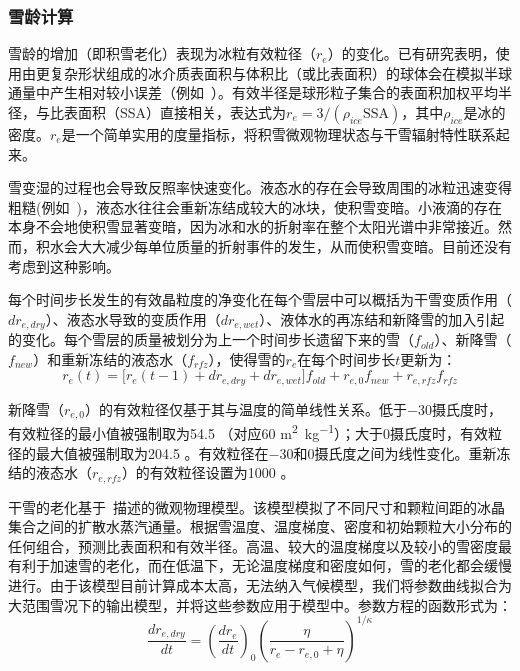 \subsubsection{雪龄计算}\label{雪龄计算}

雪龄的增加（即积雪老化）表现为冰粒有效粒径（$r_e$）的变化。已有研究表明，使用由更复杂形状组成的冰介质表面积与体积比（或比表面积）的球体会在模拟半球通量中产生相对较小误差（例如~\citet{grenfell1999RepresentationNonsphericalIce}）。有效半径是球形粒子集合的表面积加权平均半径，与比表面积（SSA）直接相关，表达式为$r_e=3/(\rho_{ice}\text{SSA})$，其中$\rho_{ice}$是冰的密度。$r_e$是一个简单实用的度量指标，将积雪微观物理状态与干雪辐射特性联系起来。

雪变湿的过程也会导致反照率快速变化。液态水的存在会导致周围的冰粒迅速变得粗糙(例如~\citet{brun1989InvestigationWetSnowMetamorphism})，液态水往往会重新冻结成较大的冰块，使积雪变暗。小液滴的存在本身不会地使积雪显著变暗，因为冰和水的折射率在整个太阳光谱中非常接近。然而，积水会大大减少每单位质量的折射事件的发生，从而使积雪变暗。目前还没有考虑到这种影响。

每个时间步长发生的有效晶粒度的净变化在每个雪层中可以概括为干雪变质作用（$dr_{e,dry}$）、液态水导致的变质作用（$dr_{e,wet}$）、液体水的再冻结和新降雪的加入引起的变化。每个雪层的质量被划分为上一个时间步长遗留下来的雪（$f_{old}$）、新降雪（$f_{new}$）和重新冻结的液态水（$f_{rfz}$），使得雪的$r_e$在每个时间步长${t}$更新为：
\begin{equation}
r_{e}(t) = \lbrack r_{e}(t - 1) + {dr}_{e,dry} + {dr}_{e,wet}\rbrack f_{old} + r_{e,0}f_{new} + r_{e,rfz}f_{rfz}
\end{equation}

新降雪（$r_{e,0}$）的有效粒径仅基于其与温度的简单线性关系。低于$-30$摄氏度时，有效粒径的最小值被强制取为54.5 \unit{}（对应60 \unit{m^{2}.kg^{-1}}）；大于0摄氏度时，有效粒径的最大值被强制取为204.5 \unit{}。有效粒径在$-30$和0摄氏度之间为线性变化。重新冻结的液态水（$r_{e,rfz}$）的有效粒径设置为1000 \unit{}。

干雪的老化基于~\citet{flanner2006LinkingSnowpackMicrophysics}描述的微观物理模型。该模型模拟了不同尺寸和颗粒间距的冰晶集合之间的扩散水蒸汽通量。根据雪温度、温度梯度、密度和初始颗粒大小分布的任何组合，预测比表面积和有效半径。高温、较大的温度梯度以及较小的雪密度最有利于加速雪的老化，而在低温下，无论温度梯度和密度如何，雪的老化都会缓慢进行。由于该模型目前计算成本太高，无法纳入气候模型，我们将参数曲线拟合为大范围雪况下的输出模型，并将这些参数应用于模型中。参数方程的函数形式为：
\begin{equation}
\frac{{dr}_{e,dry}}{dt} = \left( \frac{{dr}_{e}}{dt} \right)_{0}\left( \frac{\eta}{r_{e} - r_{e,0} + \eta} \right)^{1/\kappa}
\end{equation}

